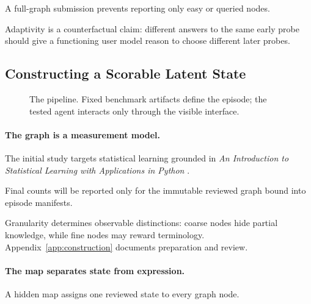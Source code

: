 A full-graph submission prevents reporting only easy or queried nodes.

Adaptivity is a counterfactual claim: different answers to the same early probe should give a functioning
user model reason to choose different later probes.

\subsection{Constructing a Scorable Latent State}

\begin{figure}[t]
\centering
{}
\caption{The \knowact pipeline. Fixed benchmark artifacts define the episode; the tested agent interacts only through the visible interface.}
\label{fig:pipeline}
\end{figure}

\paragraph{The graph is a measurement model.}
The initial study targets statistical learning grounded in \emph{An Introduction to Statistical
Learning with Applications in Python} \citep{james2023islp}.

Final counts will be reported only for the immutable reviewed graph bound into episode manifests.

Granularity determines observable distinctions: coarse nodes hide partial knowledge, while fine nodes
may reward terminology. Appendix~\ref{app:construction} documents preparation and review.

\paragraph{The map separates state from expression.}
A hidden map assigns one reviewed state to every graph node.

